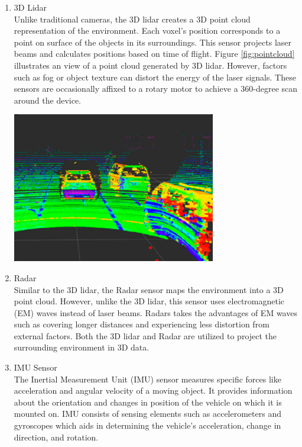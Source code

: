 \documentclass[12pt,twoside,a4paper,parskip]{scrbook} %
\begin{document}
\begin{enumerate}[label=\alph*.]
    \item 3D Lidar \\
    Unlike traditional cameras, the 3D lidar creates a 3D point cloud representation of the environment. Each voxel's position corresponds to a point on surface of the objects in its surroundings. This sensor projects laser beams and calculates positions based on time of flight. Figure \ref{fig:pointcloud} \cite{senimage} illustrates an  view of a point cloud generated by 3D lidar. However, factors such as fog or object texture can distort the energy of the laser signals. These sensors are occasionally affixed to a rotary motor to achieve a 360-degree scan around the device.
    \begin{minipage}[t]{\linewidth}
        \centering
        \includegraphics[width=0.70\textwidth]{Images/Lidardata.png}
        \label{fig:pointcloud}
        \vspace{-\baselineskip} %
    \end{minipage}
    \hfill
    
    \item Radar \\
    Similar to the 3D lidar, the Radar sensor maps the environment into a 3D point cloud. However, unlike the 3D lidar, this sensor uses electromagnetic (EM) waves instead of laser beams. Radars takes the advantages of EM waves such as covering longer distances and experiencing less distortion from external factors. Both the 3D lidar and Radar are utilized to project the surrounding environment in 3D data.
    
    \item IMU Sensor \\
    The Inertial Measurement Unit (IMU) sensor measures specific forces like acceleration and angular velocity of a moving object. It provides information about the orientation and changes in position of the vehicle on which it is mounted on. IMU consists of sensing elements such as accelerometers and gyroscopes which aids in determining the vehicle's acceleration, change in direction, and rotation.


\end{enumerate}
\end{document}
